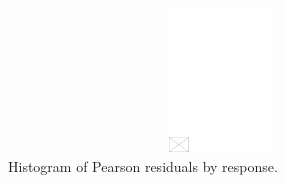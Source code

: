 \documentclass[AMA,STIX1COL]{WileyNJD-v2}
\begin{document}
\begin{figure}[h]
\centerline{\includegraphics[width=342pt,height=9pc,draft]{empty}}
\caption{Histogram of Pearson residuals by response.\label{fig4}}
\end{figure}
\end{document}
